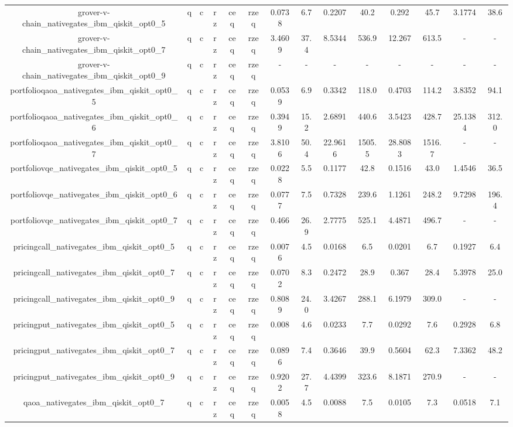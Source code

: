 \begin{table}[htb]
{\begin{tabular}{|c|c|c|c|c|c|c|c|c|c|c|c|c|c|}
grover-v-chain_nativegates_ibm_qiskit_opt0_5 & q & c & rz & ceq & rzeq & 0.0738 & 6.7 & 0.2207 & 40.2 & 0.292 & 45.7 & 3.1774 & 38.6 \\ 
grover-v-chain_nativegates_ibm_qiskit_opt0_7 & q & c & rz & ceq & rzeq & 3.4609 & 37.4 & 8.5344 & 536.9 & 12.267 & 613.5 & - & - \\ 
grover-v-chain_nativegates_ibm_qiskit_opt0_9 & q & c & rz & ceq & rzeq & - & - & - & - & - & - & - & - \\ 
portfolioqaoa_nativegates_ibm_qiskit_opt0_5 & q & c & rz & ceq & rzeq & 0.0539 & 6.9 & 0.3342 & 118.0 & 0.4703 & 114.2 & 3.8352 & 94.1 \\ 
portfolioqaoa_nativegates_ibm_qiskit_opt0_6 & q & c & rz & ceq & rzeq & 0.3949 & 15.2 & 2.6891 & 440.6 & 3.5423 & 428.7 & 25.1384 & 312.0 \\ 
portfolioqaoa_nativegates_ibm_qiskit_opt0_7 & q & c & rz & ceq & rzeq & 3.8106 & 50.4 & 22.9616 & 1505.5 & 28.8083 & 1516.7 & - & - \\ 
portfoliovqe_nativegates_ibm_qiskit_opt0_5 & q & c & rz & ceq & rzeq & 0.0228 & 5.5 & 0.1177 & 42.8 & 0.1516 & 43.0 & 1.4546 & 36.5 \\ 
portfoliovqe_nativegates_ibm_qiskit_opt0_6 & q & c & rz & ceq & rzeq & 0.0777 & 7.5 & 0.7328 & 239.6 & 1.1261 & 248.2 & 9.7298 & 196.4 \\ 
portfoliovqe_nativegates_ibm_qiskit_opt0_7 & q & c & rz & ceq & rzeq & 0.466 & 26.9 & 2.7775 & 525.1 & 4.4871 & 496.7 & - & - \\ 
pricingcall_nativegates_ibm_qiskit_opt0_5 & q & c & rz & ceq & rzeq & 0.0076 & 4.5 & 0.0168 & 6.5 & 0.0201 & 6.7 & 0.1927 & 6.4 \\ 
pricingcall_nativegates_ibm_qiskit_opt0_7 & q & c & rz & ceq & rzeq & 0.0702 & 8.3 & 0.2472 & 28.9 & 0.367 & 28.4 & 5.3978 & 25.0 \\ 
pricingcall_nativegates_ibm_qiskit_opt0_9 & q & c & rz & ceq & rzeq & 0.8089 & 24.0 & 3.4267 & 288.1 & 6.1979 & 309.0 & - & - \\ 
pricingput_nativegates_ibm_qiskit_opt0_5 & q & c & rz & ceq & rzeq & 0.008 & 4.6 & 0.0233 & 7.7 & 0.0292 & 7.6 & 0.2928 & 6.8 \\ 
pricingput_nativegates_ibm_qiskit_opt0_7 & q & c & rz & ceq & rzeq & 0.0896 & 7.4 & 0.3646 & 39.9 & 0.5604 & 62.3 & 7.3362 & 48.2 \\ 
pricingput_nativegates_ibm_qiskit_opt0_9 & q & c & rz & ceq & rzeq & 0.9202 & 27.7 & 4.4399 & 323.6 & 8.1871 & 270.9 & - & - \\ 
qaoa_nativegates_ibm_qiskit_opt0_7 & q & c & rz & ceq & rzeq & 0.0058 & 4.5 & 0.0088 & 7.5 & 0.0105 & 7.3 & 0.0518 & 7.1 \\ 

\end{tabular}}
\end{table}
